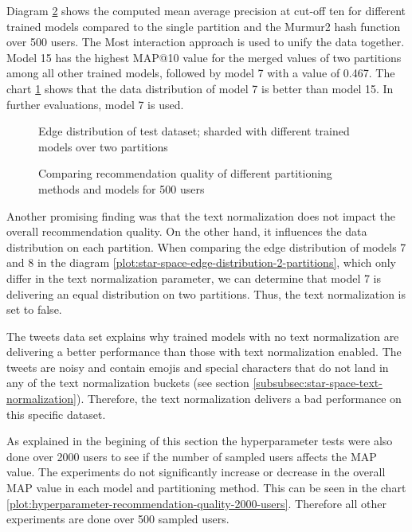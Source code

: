 Diagram \ref{plot:hyperparameter-recommendation-quality} shows the computed mean average precision at cut-off ten for different trained models compared to the single partition and the Murmur2 hash function over 500 users. The Most interaction approach is used to unify the data together. Model 15 has the highest MAP@10 value for the merged values of two partitions among all other trained models, followed by model 7 with a value of 0.467. The chart \ref{plot:edge-distribution} shows that the data distribution of model 7 is better than model 15. In further evaluations, model 7 is used.


\begin{figure}[!htb]
    \centering
    
    \caption{Edge distribution of test dataset; sharded with different trained models over two partitions}
    \label{plot:edge-distribution}
\end{figure}

\begin{figure}[!htb]
    \centering
    
    \caption{Comparing recommendation quality of different partitioning methods and models for 500 users}
    \label{plot:hyperparameter-recommendation-quality}
\end{figure}


Another promising finding was that the text normalization does not impact the overall recommendation quality. On the other hand, it influences the data distribution on each partition. When comparing the edge distribution of models 7 and 8 in the diagram \ref{plot:star-space-edge-distribution-2-partitions}, which only differ in the text normalization parameter, we can determine that model 7 is delivering an equal distribution on two partitions. Thus, the text normalization is set to false. 


The tweets data set explains why trained models with no text normalization are delivering a better performance than those with text normalization enabled. The tweets are noisy and contain emojis and special characters that do not land in any of the text normalization buckets (see section \ref{subsubsec:star-space-text-normalization}). Therefore, the text normalization delivers a bad performance on this specific dataset.


As explained in the begining of this section the hyperparameter tests were also done over 2000 users to see if the number of sampled users affects the MAP value. The experiments do not significantly increase or decrease in the overall MAP value in each model and partitioning method. This can be seen in the chart \ref{plot:hyperparameter-recommendation-quality-2000-users}. Therefore all other experiments are done over 500 sampled users.

